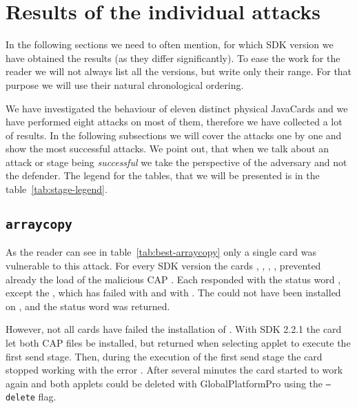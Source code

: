     \section{Results of the individual attacks}

        In the following sections we need to often mention, for which SDK version we have obtained the results (as they differ significantly). To ease the work for the reader we will not always list all the versions, but write only their range. For that purpose we will use their natural chronological ordering.%

        We have investigated the behaviour of eleven distinct physical JavaCards and we have performed eight attacks on most of them, therefore we have collected a lot of results. In the following subsections we will cover the attacks one by one and show the most successful attacks. We point out, that when we talk about an attack or stage being \textit{successful} we take the perspective of the adversary and not the defender. The legend for the tables, that we will be presented is in the table~\ref{tab:stage-legend}.

\subsection{\texttt{arraycopy}}\label{subsec:result-arraycopy}
            As the reader can see in table~\ref{tab:best-arraycopy} only a single card was vulnerable to this attack. For every SDK version the cards \Cnewcard, \Fcard, \Gcard, \Hcard, \Inewcard prevented already the load of the malicious CAP \vulnscap. Each responded with the status word \swwrongdata, except the \Cnewcard, which has failed with \swunknown and \Inewcard with \swwrongdata. The \vulnscap could not have been installed on \Icard, \Ccard and the status word \swconditionsnotsatisfied was returned.

            However, not all cards have failed the installation of \vulnscap. With SDK 2.2.1 the card \Dcard let both CAP files be installed, but returned \swclanotsupported when selecting applet to execute the first send stage. Then, during the execution of the first send stage the card stopped working with the error \scardenottransacted. After several minutes the card started to work again and both applets could be deleted with GlobalPlatformPro using the \texttt{--delete} flag.

